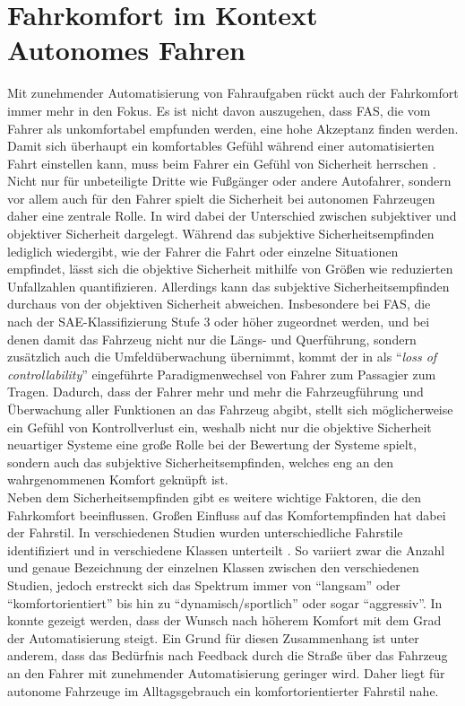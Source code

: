\section{Fahrkomfort im Kontext Autonomes Fahren}
Mit zunehmender Automatisierung von Fahraufgaben rückt auch der Fahrkomfort immer mehr in den Fokus. Es ist nicht davon auszugehen, dass FAS, die vom Fahrer als unkomfortabel empfunden werden, eine hohe Akzeptanz finden werden. \\
Damit sich überhaupt ein komfortables Gefühl während einer automatisierten Fahrt einstellen kann, muss beim Fahrer ein Gefühl von Sicherheit herrschen \cite{Festner.2019}. Nicht nur für unbeteiligte Dritte wie Fußgänger oder andere Autofahrer, sondern vor allem auch für den Fahrer spielt die Sicherheit bei autonomen Fahrzeugen daher eine zentrale Rolle. In \cite{Festner.2019} wird dabei der Unterschied zwischen subjektiver und objektiver Sicherheit dargelegt. Während das subjektive Sicherheitsempfinden lediglich wiedergibt, wie der Fahrer die Fahrt oder einzelne Situationen empfindet, lässt sich die objektive Sicherheit mithilfe von Größen wie reduzierten Unfallzahlen quantifizieren. Allerdings kann das subjektive Sicherheitsempfinden durchaus von der objektiven Sicherheit abweichen. Insbesondere bei FAS, die nach der SAE-Klassifizierung \cite{SAE klassifizierung} Stufe 3 oder höher zugeordnet werden, und bei denen damit das Fahrzeug nicht nur die Längs- und Querführung, sondern zusätzlich auch die Umfeldüberwachung übernimmt, kommt der in \cite{Elbanhawi.2015} als ``\textit{loss of controllability}'' eingeführte Paradigmenwechsel von Fahrer zum Passagier zum Tragen. Dadurch, dass der Fahrer mehr und mehr die Fahrzeugführung und Überwachung aller Funktionen an das Fahrzeug abgibt, stellt sich möglicherweise ein Gefühl von Kontrollverlust ein, weshalb nicht nur die objektive Sicherheit neuartiger Systeme eine große Rolle bei der Bewertung der Systeme spielt, sondern auch das subjektive Sicherheitsempfinden, welches eng an den wahrgenommenen Komfort geknüpft ist. \\
Neben dem Sicherheitsempfinden gibt es weitere wichtige Faktoren, die den Fahrkomfort beeinflussen. Großen Einfluss auf das Komfortempfinden hat dabei der Fahrstil. In verschiedenen Studien wurden unterschiedliche Fahrstile identifiziert und in verschiedene Klassen unterteilt \cite{Abendroth, B.; Bruder, R in Handbuch Fahrerassistenzsysteme, Bellem, Murphey}\cite{Abendroth.2009}\cite{Bellem.2016}\cite{Murphey.30.03.200902.04.2009}. So variiert zwar die Anzahl und genaue Bezeichnung der einzelnen Klassen zwischen den verschiedenen Studien, jedoch erstreckt sich das Spektrum immer von ``langsam'' oder ``komfortorientiert'' bis hin zu ``dynamisch/sportlich'' oder sogar ``aggressiv''. In \cite{Lange}\Cite{Lange.2014} konnte gezeigt werden, dass der Wunsch nach höherem Komfort mit dem Grad der Automatisierung steigt. Ein Grund für diesen Zusammenhang ist unter anderem, dass das Bedürfnis nach Feedback durch die Straße über das Fahrzeug an den Fahrer mit zunehmender Automatisierung geringer wird. Daher liegt für autonome Fahrzeuge im Alltagsgebrauch ein komfortorientierter Fahrstil nahe. 

